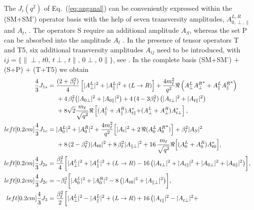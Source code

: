 The $J_i(q^2)$ of Eq.~(\ref{eq:anganal}) can be conveniently expressed within
the (SM+SM') operator basis with the help of seven transversity amplitudes,
$A_{0,\perp,\parallel}^{L,R}$ and $A_t$, \cite{Kruger:2005ep}. The operators S
require an additional amplitude $A_S$, whereas the set P can be absorbed into
the amplitude $A_t$ \cite{Altmannshofer:2008dz}. In the presence of tensor
operators T and T5, six additional transversity amplitudes $A_{ij}$ need to be
introduced, with $ij = \lbrace\parallel\perp,\, t0,\, t\!\perp,\, t\!\parallel,\,
0\!\perp,\, 0\!\parallel \rbrace$, see . In the
complete basis (SM+SM') $+$ (S+P) $+$ (T+T5) we obtain
\begin{align}
  \label{eq:J1s}
  \frac{4}{3} J_{1s} & = 
    \frac{(2 + \beta_\ell^2)}{4} \left\lbrack|\apeL|^2 + |\apaL|^2 + (L\to R) \right\rbrack
    + \frac{4 m_\ell^2}{q^2} \Re\left(\apeL^{}\apeR^* + \apaL^{}\apaR^*\right)
\\ \nonumber & \hspace{0.5cm}
  + 4\, \beta_\ell^2 \big(|A_{0\perp}|^2 + |A_{0\parallel}|^2\big)
       + 4\, (4- 3 \beta_\ell^2)\, \big(|A_{t\perp}|^2 + |A_{t\parallel}|^2\big)
\\ \nonumber & \hspace{0.5cm}
  + 8\sqrt{2} \frac{m_\ell}{\sqrt{q^2}} \Re\left\lbrack
      (\apaL + \apaR) A_{t\parallel}^* {+ (\apeL + \apeR) A_{t\perp}^*}
    \right\rbrack , 
\\left\lbrack0.2cm]
  \frac{4}{3} J_{1c} & = 
    |\azeL|^2 +|\azeR|^2
  + \frac{4 m_\ell^2}{q^2} \Big[|A_t|^2 + 2\,\Re(\azeL^{}\azeR^*) \Big]
  + \beta_\ell^2 |A_S|^2 
\\ \nonumber & \hspace{0.5cm}
  + 8\, (2 - \beta_\ell^2) |A_{t0}|^2 + 8\, \beta_\ell^2 |A_{\parallel\perp}|^2
  + 16\, \frac{m_\ell}{\sqrt{q^2}} \Re\Big[ (\azeL + \azeR) A_{t0}^*\Big],
\\left\lbrack0.2cm]
  \frac{4}{3} J_{2s} & =
    \frac{\beta_\ell^2}{4} \bigg[ |\apeL|^2+ |\apaL|^2 + (L\to R)
       - 16 \, \big(|A_{t\perp}|^2 + |A_{t\parallel}|^2 + |A_{0\perp}|^2 + |A_{0\parallel}|^2 \big) \bigg],
\\left\lbrack0.2cm]
  \label{eq:J2c}
  \frac{4}{3} J_{2c} & =
    -\beta_\ell^2 \bigg[|\azeL|^2 + |\azeR|^2
        - 8 \, \big(|A_{t0}|^2 + |A_{\parallel\perp}|^2 \big)\bigg],
\\left\lbrack0.2cm]
  \frac{4}{3} J_3 & =
    \frac{\beta_\ell^2}{2} \bigg[ |\apeL|^2 - |\apaL|^2  + (L\to R)
      + 16\, \big( |A_{t\parallel}^{}|^2 - |A_{t\perp}^{}|^2 +

\end{align}
